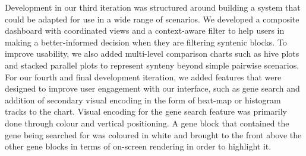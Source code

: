 Development in our third iteration was structured around building a system that could be adapted for use in a wide range of scenarios. We developed a composite dashboard with coordinated views and a context-aware filter to help users in making a better-informed decision when they are filtering syntenic blocks. To improve usability, we also added multi-level comparison charts such as hive plots and stacked parallel plots to represent synteny beyond simple pairwise scenarios. For our fourth and final development iteration, we added features that were designed to improve user engagement with our interface, such as gene search and addition of secondary visual encoding in the form of heat-map or histogram tracks to the chart. Visual encoding for the gene search feature was primarily done through colour and vertical positioning. A gene block that contained the gene being searched for was coloured in white and brought to the front above the other gene blocks in terms of on-screen rendering in order to highlight it.